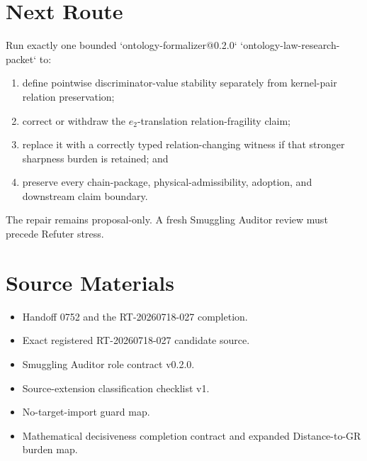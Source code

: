 \documentclass[11pt]{article}
\begin{document}
\section{Next Route}

Run exactly one bounded `ontology-formalizer@0.2.0`
`ontology-law-research-packet` to:
\begin{enumerate}[leftmargin=*]
  \item define pointwise discriminator-value stability separately from
  kernel-pair relation preservation;
  \item correct or withdraw the \(e_2\)-translation relation-fragility claim;
  \item replace it with a correctly typed relation-changing witness if that
  stronger sharpness burden is retained; and
  \item preserve every chain-package, physical-admissibility, adoption, and
  downstream claim boundary.
\end{enumerate}

The repair remains proposal-only. A fresh Smuggling Auditor review must precede
Refuter stress.

\section{Source Materials}

\begin{itemize}[leftmargin=*]
  \item Handoff 0752 and the RT-20260718-027 completion.
  \item Exact registered RT-20260718-027 candidate source.
  \item Smuggling Auditor role contract v0.2.0.
  \item Source-extension classification checklist v1.
  \item No-target-import guard map.
  \item Mathematical decisiveness completion contract and expanded
  Distance-to-GR burden map.
\end{itemize}
\end{document}
